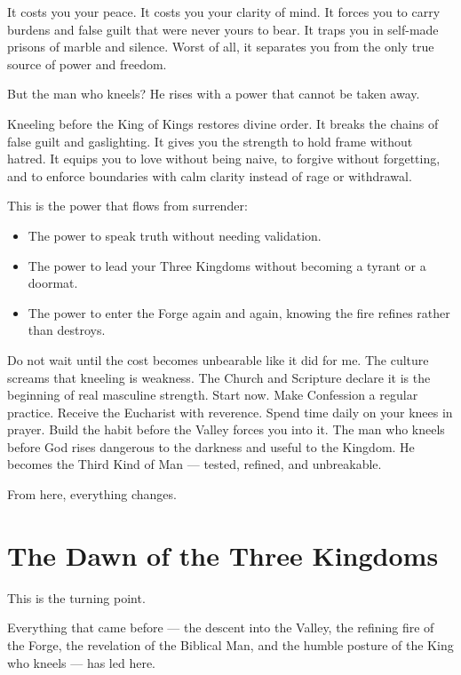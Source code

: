 \documentclass[12pt,a4paper]{book}
\begin{document}
It costs you your peace. It costs you your clarity of mind. It forces you to carry burdens and false guilt that were never yours to bear. It traps you in self-made prisons of marble and silence. Worst of all, it separates you from the only true source of power and freedom.

But the man who kneels? He rises with a power that cannot be taken away.

Kneeling before the King of Kings restores divine order. It breaks the chains of false guilt and gaslighting. It gives you the strength to hold frame without hatred. It equips you to love without being naive, to forgive without forgetting, and to enforce boundaries with calm clarity instead of rage or withdrawal.

This is the power that flows from surrender:
\begin{itemize}

\item{The power to speak truth without needing validation.}

\item{The power to lead your Three Kingdoms without becoming a tyrant or a doormat.}

\item{The power to enter the Forge again and again, knowing the fire refines rather than destroys.}

\end{itemize}


Do not wait until the cost becomes unbearable like it did for me. The culture screams that kneeling is weakness. The Church and Scripture declare it is the beginning of real masculine strength. Start now. Make Confession a regular practice. Receive the Eucharist with reverence. Spend time daily on your knees in prayer. Build the habit before the Valley forces you into it.
The man who kneels before God rises dangerous to the darkness and useful to the Kingdom. He becomes the Third Kind of Man — tested, refined, and unbreakable.

From here, everything changes.

\section{The Dawn of the Three Kingdoms }
This is the turning point.

Everything that came before — the descent into the Valley, the refining fire of the Forge, the revelation of the Biblical Man, and the humble posture of the King who kneels — has led here.
\end{document}
